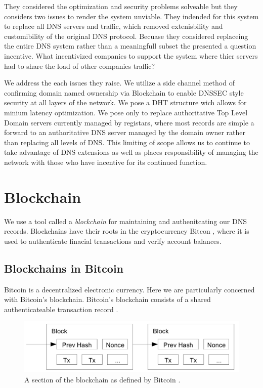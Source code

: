 \documentclass[11pt]{IEEEtran} %
\begin{document}
They considered the optimization and security problems solveable but they considers two issues to render the system unviable. They indended for this system to replace all DNS servers and traffic, which removed extenisbility and customibility of the original DNS protocol. Becuase they considered replaceing the entire DNS system rather than a meaningfull subset the presented a question incentive. What incentivized companies to support the system where thier servers had to share the load of other companies traffic?
 
 
We address the each issues they raise. We utilize a side channel method of confirming domain named ownership via Blockchain to enable DNSSEC style security at all layers of the network. We pose a DHT structure wich allows for minium latency optimization. We pose only to replace authoritative Top Level Domain servers currently managed by registars, where most records are simple a forward to an authoritative DNS server managed by the domain owner rather than replacing all levels of DNS. This limiting of scope allows us to continue to take advantage of DNS extensions as well as places responsibility of managing the network with those who have incentive for its continued function.


\section{Blockchain}
We use a tool called a \emph{blockchain} for maintaining and  authenitcating our DNS records.  Blockchains have their roots in the cryptocurrency Bitcon \cite{bitcoin}, where it is used to authenticate finacial transactions and verify account balances.

\subsection{Blockchains in Bitcoin}
Bitcoin is a decentralized electronic currency. Here we are particularly concerned with Bitcoin's blockchain. Bitcoin's blockchain consists of a shared authenticateable transaction record \cite{namecoin}  \cite{bitcoin} .


\begin{figure}
    \includegraphics[width=\linewidth]{blockchain}
    \caption{A section of the blockchain as defined by Bitcoin \cite{bitcoin}.}
    \label{blockchain}
\end{figure}
\end{document}
